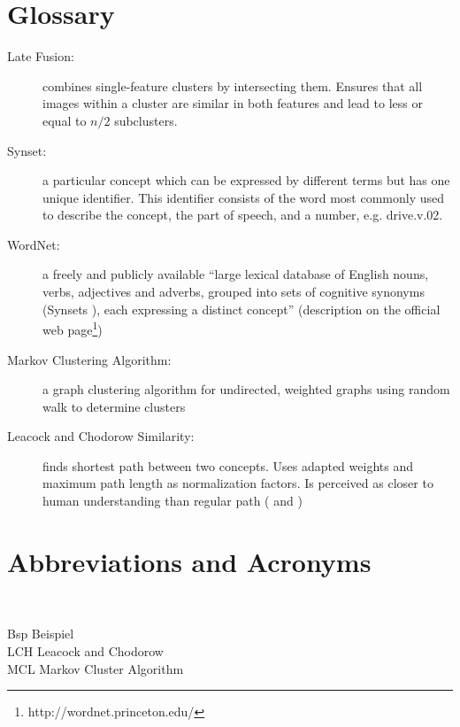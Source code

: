 \section{Glossary} %

\begin{description}
\item[Late Fusion:] combines single-feature clusters by intersecting them. Ensures that all images within a cluster are similar in both features and lead to less or equal to $n/2$ subclusters.

\item[Synset:] a particular concept which can be expressed by different terms but has one unique identifier. This identifier consists of the word most commonly used to describe the concept, the part of speech, and a number, e.g. drive.v.02.

\item[WordNet:] a freely and publicly available ``large lexical database of English nouns, verbs, adjectives and adverbs, grouped into sets of cognitive synonyms (Synsets ), each expressing a distinct concept'' (description on the official web page\footnote{http://wordnet.princeton.edu/})

\item[Markov Clustering Algorithm:] a graph clustering algorithm for undirected, weighted graphs using random walk to determine clusters

\item[Leacock and Chodorow Similarity:] finds shortest path between two concepts. Uses adapted weights and maximum path length as normalization factors. Is perceived as closer to human understanding than regular path (\cite{budanitsky01} and \cite{pedersen2004wordnet})
\end{description}


\newpage

\section{Abbreviations and Acronyms}

\begin{tabbing}
\hspace*{3cm}\=  \\ \kill

Bsp \> Beispiel\\
LCH \> Leacock and Chodorow\\
MCL \> Markov Cluster Algorithm\\

\end{tabbing}
